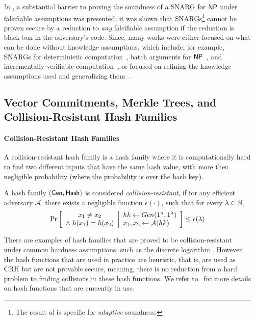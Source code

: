 In \cite{gentry2011separating}, a substantial barrier to proving the soundness of a SNARG for ${\mathsf{NP}}$ under falsifiable assumptions was presented; it was shown that SNARGs\footnote{
The result of \cite{gentry2011separating} is specific for \emph{adaptive} soundness.
} cannot be proven secure by a reduction to \emph{any} falsifiable assumption if the reduction is black-box in the adversary's code. Since, many works were either focused on what can be done without knowledge assumptions, which include,
for example, SNARGs for deterministic computation~\cite{kalai2019delegate, jawale2021snargs, choudhuri2021snargs},
batch arguments for ${\mathsf{NP}}$~\cite{choudhuri2021non, hulett2022snargs, devadas2022rate, cryptoeprint:2022/1320},
and incrementally verifiable computation~\cite{paneth2022incrementally},
or focused on refining the knowledge assumptions used and generalizing them~\cite{bitansky2012extractable}.


\subsection{Vector Commitments, Merkle Trees, and Collision-Resistant Hash Families}\label{app:crypto:hashes}
\paragraph{Collision-Resistant Hash Families}
A collision-resistant hash family is a hash family where it is computationally hard to find two different inputs that have the same hash value, with more then negligible probability (where the probability is over the hash key).
\begin{definition} 
    A hash family $(\mathsf{Gen}, \mathsf{Hash})$ is considered \emph{collision-resistant}, if for any efficient adversary $\mathcal{A}$, there exists a negligible function $\epsilon(\cdot)$, such that for every $\lambda\in \mathbb{N}$,
    \begin{gather*}
        \underset{}{\text{Pr}}\left [
        \begin{array}{cc}
        x_1 \neq x_2 \\
        \wedge\ h(x_1)=h(x_2)
        \end{array}
        \middle\vert
        \begin{array}{ll}
             hk \leftarrow Gen(1^n, 1^\lambda) \\
             x_1, x_2 \leftarrow\mathcal{A}(hk)
        \end{array}
        \right ] \leq \epsilon(\lambda)
    \end{gather*}
\end{definition}
There are examples of hash families that are proved to be collision-resistant under common hardness assumptions, such as the discrete logarithm \cite{vsh2006}. However, the hash functions that are used in practice are heuristic, that is, are used as CRH but are not provable secure, meaning, there is no reduction from a hard problem to finding collisions in these hash functions. We refer to~\cite{hashState} for more details on hash functions that are currently in use.

